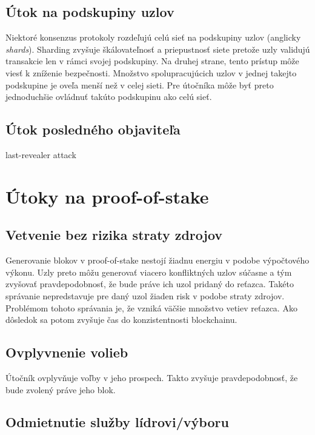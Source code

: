 \subsection{Útok na podskupiny uzlov}\label{subsec:shard-attack}

Niektoré konsenzus protokoly rozdeľujú celú sieť na podskupiny uzlov (anglicky \textit{shards}). Sharding zvyšuje škálovateľnosť a priepustnosť siete pretože uzly validujú transakcie len v rámci svojej podskupiny. Na druhej strane, tento prístup môže viesť k zníženie bezpečnosti. Množstvo spolupracujúcich uzlov v jednej takejto podskupine je oveľa menší než v celej sieti. Pre útočníka môže byť preto jednoduchšie ovládnuť takúto podskupinu ako celú sieť.

\subsection{Útok posledného objaviteľa}\label{subsec:lst-re-attack}

last-revealer attack~\cite{lastRevealerAttack}

\section{Útoky na proof-of-stake}

\subsection{Vetvenie bez rizika straty zdrojov}
Generovanie blokov v proof-of-stake nestojí žiadnu energiu v podobe výpočtového výkonu. Uzly preto môžu generovať viacero konfliktných uzlov súčasne a tým zvyšovať pravdepodobnosť, že bude práve ich uzol pridaný do reťazca. Takéto správanie nepredstavuje pre daný uzol žiaden risk v podobe straty zdrojov. Problémom tohoto správania je, že vzniká väčšie množstvo vetiev reťazca. Ako dôsledok sa potom zvyšuje čas do konzistentnosti blockchainu.

\subsection{Ovplyvnenie volieb}
Útočník ovplyvňuje voľby v jeho prospech. Takto zvyšuje pravdepodobnosť, že bude zvolený práve jeho blok. 

\subsection{Odmietnutie služby lídrovi/výboru}

